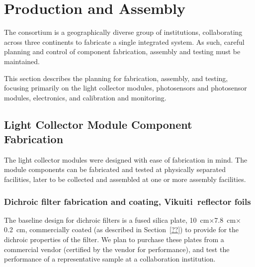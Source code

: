 \section{Production and Assembly}
\label{sec:fdsp-pd-prod-assy}
The \single {} consortium is a geographically diverse group of institutions, collaborating across three continents to fabricate a single integrated system.  As such, careful planning and control of component fabrication, assembly and testing must be maintained.

This section describes the planning for fabrication, assembly, and testing, focusing primarily on the  light collector modules, photosensors and photosensor modules, electronics, and calibration and monitoring.

\subsection{Light Collector Module Component Fabrication}

The  light collector modules were designed with ease of fabrication in mind.  The module components can be fabricated and  tested at physically separated facilities, later to be collected and assembled at one or more assembly facilities.  %

\subsubsection{Dichroic filter fabrication and coating, Vikuiti\texttrademark\ reflector foils}

The baseline design for dichroic filters is %
a fused silica plate,  \SI{10}{cm}$\times$\SI{7.8}{cm}$\times$\SI{0.2}{cm}, commercially coated (as described %
in Section~\ref{??}) to provide for the dichroic properties of the filter.  %
We plan to purchase these plates from a commercial vendor (certified by the vendor for performance), and test the performance of a representative sample at a collaboration institution.  

